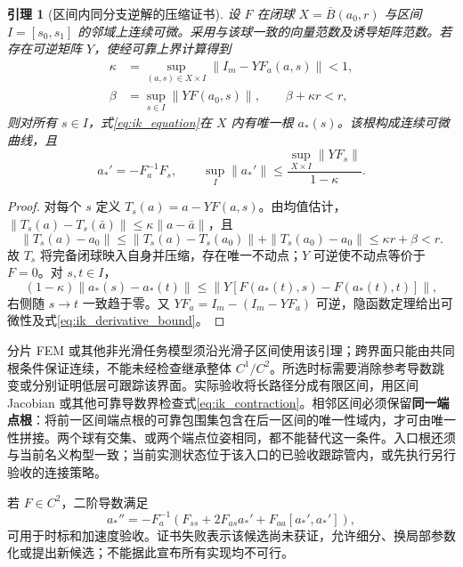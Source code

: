 \documentclass[UTF8,fontset=fandol,zihao=5,a4paper]{ctexart}
\newtheorem{lemma}[theorem]{引理}
\theoremstyle{definition}
\theoremstyle{remark}\newtheorem{remark}[theorem]{说明}
\numberwithin{equation}{section}
\begin{document}
\begin{lemma}[区间内同分支逆解的压缩证书]
\label{lem:interval_ik}
设 $F$ 在闭球 $X=\overline B(a_0,r)$ 与区间 $I=[s_0,s_1]$ 的邻域上连续可微。采用与该球一致的向量范数及诱导矩阵范数。若存在可逆矩阵 $Y$，使经可靠上界计算得到
\begin{align}
 \kappa&=\sup_{(a,s)\in X\times I}\|I_m-YF_a(a,s)\|<1,\\
 \beta&=\sup_{s\in I}\|YF(a_0,s)\|,\qquad
 \beta+\kappa r<r,
 \label{eq:ik_contraction}
\end{align}
则对所有 $s\in I$，式\eqref{eq:ik_equation}在 $X$ 内有唯一根 $a_*(s)$。该根构成连续可微曲线，且
\begin{equation}
 a_*'=-F_a^{-1}F_s,\qquad
 \sup_I\|a_*'\|\le
 \frac{\sup_{X\times I}\|YF_s\|}{1-\kappa}.
 \label{eq:ik_derivative_bound}
\end{equation}
\end{lemma}
\begin{proof}
对每个 $s$ 定义 $T_s(a)=a-YF(a,s)$。由均值估计，
$\|T_s(a)-T_s(\bar a)\|\le\kappa\|a-\bar a\|$，且
\[
 \|T_s(a)-a_0\|\le
 \|T_s(a)-T_s(a_0)\|+\|T_s(a_0)-a_0\|
 \le\kappa r+\beta<r.
\]
故 $T_s$ 将完备闭球映入自身并压缩，存在唯一不动点；$Y$ 可逆使不动点等价于 $F=0$。对 $s,t\in I$，
\[
 (1-\kappa)\|a_*(s)-a_*(t)\|
 \le\|Y[F(a_*(t),s)-F(a_*(t),t)]\|,
\]
右侧随 $s\to t$ 一致趋于零。又 $YF_a=I_m-(I_m-YF_a)$ 可逆，隐函数定理给出可微性及式\eqref{eq:ik_derivative_bound}。
\end{proof}

分片 FEM 或其他非光滑任务模型须沿光滑子区间使用该引理；跨界面只能由共同根条件保证连续，不能未经检查继承整体 $C^1/C^2$。所选时标需要消除参考导数跳变或分别证明低层可跟踪该界面。实际验收将长路径分成有限区间，用区间 Jacobian 或其他可靠导数界检查式\eqref{eq:ik_contraction}。相邻区间必须保留\textbf{同一端点根}：将前一区间端点根的可靠包围集包含在后一区间的唯一性域内，才可由唯一性拼接。两个球有交集、或两个端点位姿相同，都不能替代这一条件。入口根还须与当前名义构型一致；当前实测状态位于该入口的已验收跟踪管内，或先执行另行验收的连接策略。

若 $F\in C^2$，二阶导数满足
\begin{equation}
 a_*''=-F_a^{-1}
 \left(F_{ss}+2F_{as}a_*'+F_{aa}[a_*',a_*']\right),
 \label{eq:ik_second_derivative}
\end{equation}
可用于时标和加速度验收。证书失败表示该候选尚未获证，允许细分、换局部参数化或提出新候选；不能据此宣布所有实现均不可行。
\end{document}

